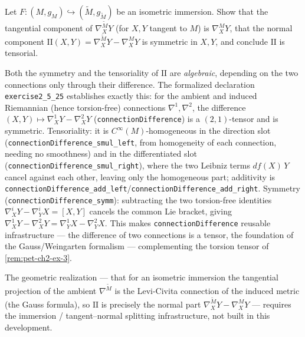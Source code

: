 \begin{remark}
  \label{rem:pet-ch2-ex-25}
  \leanok
  Let $F:(M,g_M)\hookrightarrow(\tilde M,g_{\tilde M})$ be an isometric
  immersion. Show that the tangential component of
  $\nabla^{\tilde M}_XY$ (for $X,Y$ tangent to $M$) is $\nabla^M_XY$, that the
  normal component $\mathrm{I\!I}(X,Y)=\nabla^{\tilde M}_XY-\nabla^M_XY$ is
  symmetric in $X,Y$, and conclude $\mathrm{I\!I}$ is tensorial.

  Both the symmetry and the tensoriality of $\mathrm{I\!I}$ are \emph{algebraic},
  depending on the two connections only through their difference. The formalized
  declaration \texttt{exercise2\_5\_25} establishes exactly this: for the ambient
  and induced Riemannian (hence torsion-free) connections $\nabla^1,\nabla^2$, the
  difference $(X,Y)\mapsto\nabla^1_XY-\nabla^2_XY$ (\texttt{connectionDifference})
  is a $(2,1)$-tensor and is symmetric. Tensoriality: it is $C^\infty(M)$-homogeneous
  in the direction slot (\texttt{connectionDifference\_smul\_left}, from homogeneity
  of each connection, needing no smoothness) and in the differentiated slot
  (\texttt{connectionDifference\_smul\_right}), where the two Leibniz terms
  $df(X)\,Y$ cancel against each other, leaving only the homogeneous part; additivity
  is \texttt{connectionDifference\_add\_left}/\texttt{connectionDifference\_add\_right}.
  Symmetry (\texttt{connectionDifference\_symm}): subtracting the two torsion-free
  identities $\nabla^i_XY-\nabla^i_YX=[X,Y]$ cancels the common Lie bracket, giving
  $\nabla^1_XY-\nabla^2_XY=\nabla^1_YX-\nabla^2_YX$. This makes
  \texttt{connectionDifference} reusable infrastructure — the difference of two
  connections is a tensor, the foundation of the Gauss/Weingarten formalism —
  complementing the torsion tensor of \cref{rem:pet-ch2-ex-3}.

  The geometric realization — that for an isometric immersion the tangential
  projection of the ambient $\nabla^{\tilde M}$ is the Levi-Civita connection of the
  induced metric (the Gauss formula), so $\mathrm{I\!I}$ is precisely the normal
  part $\nabla^{\tilde M}_XY-\nabla^M_XY$ — requires the immersion / tangent–normal
  splitting infrastructure, not built in this development.
\end{remark}

